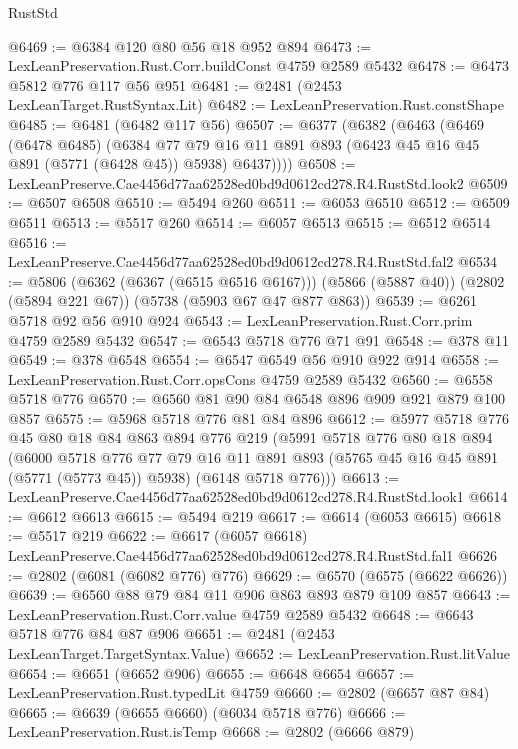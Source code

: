 \begin{lexlean}{RustStd}
\begin{coremodule}
@6469 := @6384 @120 @80 @56 @18 @952 @894
@6473 := LexLeanPreservation.Rust.Corr.buildConst @4759 @2589 @5432
@6478 := @6473 @5812 @776 @117 @56 @951
@6481 := @2481 (@2453 LexLeanTarget.RustSyntax.Lit)
@6482 := LexLeanPreservation.Rust.constShape
@6485 := @6481 (@6482 @117 @56)
@6507 := @6377
    (@6382
      (@6463
        (@6469
          (@6478 @6485)
          (@6384
            @77
            @79
            @16
            @11
            @891
            @893
            (@6423 @45 @16 @45 @891 (@5771 (@6428 @45)) @5938)
            @6437))))
@6508 := LexLeanPreserve.Cae4456d77aa62528ed0bd9d0612cd278.R4.RustStd.look2
@6509 := @6507 @6508
@6510 := @5494 @260
@6511 := @6053 @6510
@6512 := @6509 @6511
@6513 := @5517 @260
@6514 := @6057 @6513
@6515 := @6512 @6514
@6516 := LexLeanPreserve.Cae4456d77aa62528ed0bd9d0612cd278.R4.RustStd.fal2
@6534 := @5806
    (@6362 (@6367 (@6515 @6516 @6167)))
    (@5866 (@5887 @40))
    (@2802 (@5894 @221 @67))
    (@5738 (@5903 @67 @47 @877 @863))
@6539 := @6261 @5718 @92 @56 @910 @924
@6543 := LexLeanPreservation.Rust.Corr.prim @4759 @2589 @5432
@6547 := @6543 @5718 @776 @71 @91
@6548 := @378 @11
@6549 := @378 @6548
@6554 := @6547 @6549 @56 @910 @922 @914
@6558 := LexLeanPreservation.Rust.Corr.opsCons @4759 @2589 @5432
@6560 := @6558 @5718 @776
@6570 := @6560 @81 @90 @84 @6548 @896 @909 @921 @879 @100 @857
@6575 := @5968 @5718 @776 @81 @84 @896
@6612 := @5977
    @5718
    @776
    @45
    @80
    @18
    @84
    @863
    @894
    @776
    @219
    (@5991
      @5718
      @776
      @80
      @18
      @894
      (@6000
        @5718
        @776
        @77
        @79
        @16
        @11
        @891
        @893
        (@5765 @45 @16 @45 @891 (@5771 (@5773 @45)) @5938)
        (@6148 @5718 @776)))
@6613 := LexLeanPreserve.Cae4456d77aa62528ed0bd9d0612cd278.R4.RustStd.look1
@6614 := @6612 @6613
@6615 := @5494 @219
@6617 := @6614 (@6053 @6615)
@6618 := @5517 @219
@6622 := @6617 (@6057 @6618) LexLeanPreserve.Cae4456d77aa62528ed0bd9d0612cd278.R4.RustStd.fal1
@6626 := @2802 (@6081 (@6082 @776) @776)
@6629 := @6570 (@6575 (@6622 @6626))
@6639 := @6560 @88 @79 @84 @11 @906 @863 @893 @879 @109 @857
@6643 := LexLeanPreservation.Rust.Corr.value @4759 @2589 @5432
@6648 := @6643 @5718 @776 @84 @87 @906
@6651 := @2481 (@2453 LexLeanTarget.TargetSyntax.Value)
@6652 := LexLeanPreservation.Rust.litValue
@6654 := @6651 (@6652 @906)
@6655 := @6648 @6654
@6657 := LexLeanPreservation.Rust.typedLit @4759
@6660 := @2802 (@6657 @87 @84)
@6665 := @6639 (@6655 @6660) (@6034 @5718 @776)
@6666 := LexLeanPreservation.Rust.isTemp
@6668 := @2802 (@6666 @879)

\end{coremodule}
\end{lexlean}

